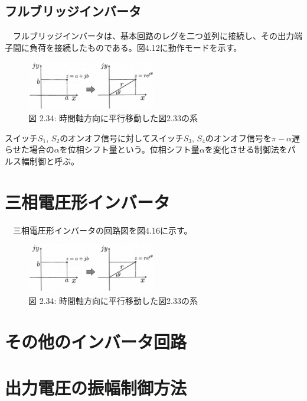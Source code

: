 \documentclass{article}
\begin{document}
\subsection{フルブリッジインバータ}
　フルブリッジインバータは、基本回路のレグを二つ並列に接続し、その出力端子間に負荷を接続したものである。図4.12に動作モードを示す。
\begin{figure}[H]
    \centering
    \includegraphics[width=0.5\textwidth]{images/2_26.jpg}
    \caption{図 2.34: 時間軸方向に平行移動した図2.33の系}
    \label{fig:2.34}
\end{figure}
スイッチ\(S_1\), \(S_2\)のオンオフ信号に対してスイッチ\(S_3\), \(S_4\)のオンオフ信号を\(\pi - \alpha \)遅らせた場合の\(\alpha \)を位相シフト量という。位相シフト量\(\alpha \)を変化させる制御法をパルス幅制御と呼ぶ。

\section{三相電圧形インバータ}
　三相電圧形インバータの回路図を図4.16に示す。
\begin{figure}[H]
    \centering
    \includegraphics[width=0.5\textwidth]{images/2_26.jpg}
    \caption{図 2.34: 時間軸方向に平行移動した図2.33の系}
    \label{fig:2.34}
\end{figure}



\section{その他のインバータ回路}

\section{出力電圧の振幅制御方法}


\setcounter{section}{7}
\renewcommand{\thesection}{4.\arabic{section}}
\end{document}

